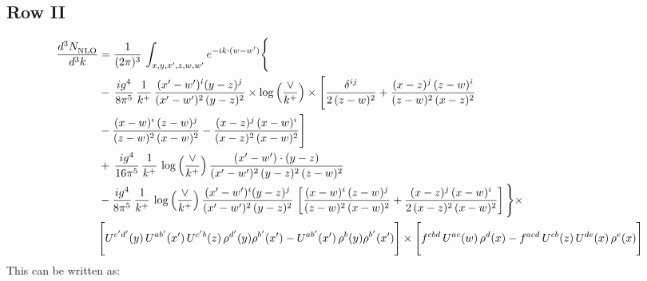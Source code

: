 \documentclass[9pt]{article}
\numberwithin{equation}{section}
\begin{document}
\subsection{Row II}
\begin{align}
     \frac{d^{3}N_{\rm NLO}^{\rm}}{d^{3}k}  & =   \frac{1}{(2\pi)^{3}}\, \int_{x,y,x',z,w,w^{\prime}} e^{-ik\cdot (w-w')} \Bigg\{\notag \\
& -\,\frac{ig^{4}}{8\pi^{5}}\,\frac{1}{k^{+}}\,\frac{(x'-w')^{i}(y-z)^{j}}{(x'-w')^{2}\,(y-z)^{2}}\times \log{\left(\frac{\vee}{k^{+}}\right)}\times \Bigg[\frac{\delta^{ij}}{2\,(z-w)^{2}}+\frac{(x-z)^{j}\,(z-w)^{i}}{(z-w)^{2}\,(x-z)^{2}}\notag \\ & -\frac{(x-w)^{i}\,(z-w)^{j}}{(z-w)^{2}\,(x-w)^{2}}-\frac{(x-z)^{j}\,(x-w)^{i}}{(x-z)^{2}\,(x-w)^{2}}\Bigg] \notag \\
& +\,\frac{ig^{4}}{16\pi^{5}}\,\frac{1}{k^{+}}\,\log{\left(\frac{\vee}{k^{+}}\right)}\, \frac{(x'-w')\cdot (y-z)}{(x'-w')^{2}\,(y-z)^{2}\,(z-w)^{2}} \notag \\
& -\frac{ig^{4}}{8\pi^{5}}\,\frac{1}{k^{+}}\,\log{\left(\frac{\vee}{k^{+}}\right)}\,\frac{(x'-w')^{i}(y-z)^{j}}{(x'-w')^{2}\,(y-z)^{2}}\,\left[\frac{(x-w)^{i}\,(z-w)^{j}}{(z-w)^{2}\,(x-w)^{2}}+\frac{(x-z)^{j}\,(x-w)^{i}}{2\,(x-z)^{2}\, (x-w)^{2}}\right]\Bigg\}\times \notag \\ & \Bigg[U^{c'd'}(y)\,U^{ab'}(x')\,U^{c'b}(z)\,\rho^{d'}(y)\rho^{b'}(x')-U^{ab'}(x')\,\rho^{b}(y)\rho^{b'}(x')\Bigg]\times\Bigg[f^{cbd}\,U^{ac}(w)\,\rho^{d}(x)-f^{acd}\, U^{cb}(z)\,U^{de}(x)\,\rho^{e}(x)\Bigg]
\end{align}
This can be written as:
\end{document}
